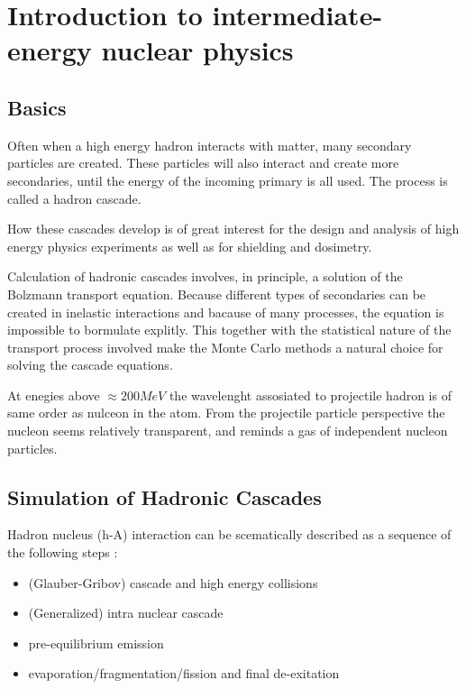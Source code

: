 
\section{Introduction to intermediate-energy nuclear physics}

\subsection{Basics}
Often when a high energy hadron interacts with matter,
many secondary particles are created.
These particles will also interact and create more secondaries,
until the energy of the incoming primary is all used.
The process is called a hadron cascade. 


How these cascades develop is of great interest 
for the design and analysis of high energy physics experiments
as well as for shielding and dosimetry.


Calculation of hadronic cascades involves,
in principle, a solution of the Bolzmann transport equation.
Because different types of secondaries can be created in inelastic interactions
and bacause of many processes,
the equation is impossible to bormulate explitly.
This together with the statistical nature of the transport process involved
make the Monte Carlo methods a natural choice for solving the cascade equations.

At enegies above $\approx 200 MeV$ the wavelenght assosiated to projectile hadron 
is of same order as nulceon in the atom.
From the projectile particle perspective the nucleon seems relatively transparent,
and reminds a gas of independent nucleon particles.  
\subsection{Simulation of Hadronic Cascades}

Hadron nucleus (h-A) interaction can be scematically described as a
sequence of the following steps \cite{ferrari00}:

\begin{itemize}
\item (Glauber-Gribov) cascade and high energy collisions
\item (Generalized) intra nuclear cascade
\item pre-equilibrium emission
\item evaporation/fragmentation/fission and final de-exitation
\end{itemize}

